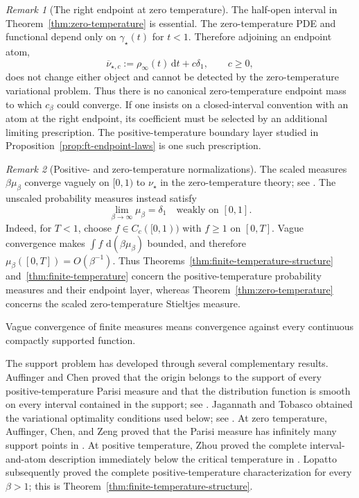 \documentclass[10pt]{amsart}
\theoremstyle{definition}
\theoremstyle{remark}
\newtheorem{remark}[remark]{Remark}
\numberwithin{equation}{section}
\newcommand{\1}{\mathbf 1}
\newcommand{\dd}{\,\mathrm d}
\begin{document}
\begin{remark}[The right endpoint at zero temperature]
\label{rem:zero-endpoint-convention}
The half-open interval in Theorem~\ref{thm:zero-temperature} is essential.  The zero-temperature PDE and functional depend only on $\gamma_\star(t)$ for $t<1$.  Therefore adjoining an endpoint atom,
\begin{equation*}
 \overline\nu_{\star,c}
 :=\rho_\infty(t)\dd t+c\delta_1,
 \qquad c\geq0,
\end{equation*}
does not change either object and cannot be detected by the zero-temperature variational problem.  Thus there is no canonical zero-temperature endpoint mass to which $c_\beta$ could converge.  If one insists on a closed-interval convention with an atom at the right endpoint, its coefficient must be selected by an additional limiting prescription.  The positive-temperature boundary layer studied in Proposition~\ref{prop:ft-endpoint-laws} is one such prescription.
\end{remark}

\begin{remark}[Positive- and zero-temperature normalizations]
\label{rem:normalizations}
The scaled measures $\beta\mu_\beta$ converge vaguely on $[0,1)$ to $\nu_\star$ in the zero-temperature theory; see \cite[proof of Theorem 2]{AuffingerChenZeng}. The unscaled probability measures instead satisfy
\begin{equation*}
\lim_{\beta\to\infty}\mu_\beta=\delta_1
\quad\text{weakly on }[0,1].
\end{equation*}
Indeed, for $T<1$, choose $f\in C_c([0,1))$ with $f\geq1$ on $[0,T]$. Vague convergence makes $\int f\,\dd(\beta\mu_\beta)$ bounded, and therefore $\mu_\beta([0,T])=O(\beta^{-1})$. Thus Theorems~\ref{thm:finite-temperature-structure} and~\ref{thm:finite-temperature} concern the positive-temperature probability measures and their endpoint layer, whereas Theorem~\ref{thm:zero-temperature} concerns the scaled zero-temperature Stieltjes measure.
\end{remark}

Vague convergence of finite measures means convergence against every continuous compactly supported function.



The support problem has developed through several complementary results. Auffinger and Chen proved that the origin belongs to the support of every positive-temperature Parisi measure and that the distribution function is smooth on every interval contained in the support; see \cite[Theorems 1 and 2]{AuffingerChenProperties}. Jagannath and Tobasco obtained the variational optimality conditions used below; see \cite[Corollary 3.6 and Proposition 1.1]{JagannathTobasco2017}. At zero temperature, Auffinger, Chen, and Zeng proved that the Parisi measure has infinitely many support points in \cite[Theorem 1]{AuffingerChenZeng}. At positive temperature, Zhou proved the complete interval-and-atom description immediately below the critical temperature in \cite[Theorem 1]{Zhou2025}. Lopatto subsequently proved the complete positive-temperature characterization for every $\beta>1$; this is Theorem~\ref{thm:finite-temperature-structure}.
\end{document}
